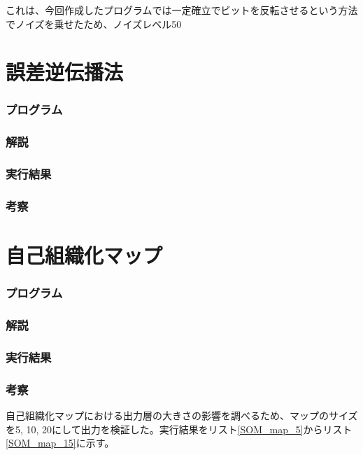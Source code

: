 \documentclass{jsarticle}
\begin{document}
これは、今回作成したプログラムでは一定確立でビットを反転させるという方法でノイズを乗せたため、ノイズレベル50%

\part{誤差逆伝播法}
\section{プログラム}


\section{解説}


\section{実行結果}


\section{考察}


\part{自己組織化マップ}
\section{プログラム}


\section{解説}


\section{実行結果}


\section{考察}
自己組織化マップにおける出力層の大きさの影響を調べるため、マップのサイズを5, 10, 20にして出力を検証した。実行結果をリスト\ref{SOM_map_5}からリスト\ref{SOM_map_15}に示す。
\end{document}
